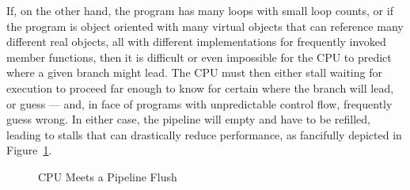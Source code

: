 If, on the other hand, the program has many loops with small loop counts,
or if the program is object oriented with many virtual objects that
can reference many different real objects, all with different implementations
for frequently invoked member functions, then it is difficult or even
impossible for the CPU to predict where a given branch might lead.
The CPU must then either stall waiting for execution to proceed far enough
to know for certain where the branch will lead, or guess --- and, in
face of programs with unpredictable control flow, frequently guess wrong.
In either case, the pipeline will empty and have to be refilled, leading
to stalls that can drastically reduce performance,
as fancifully depicted in Figure~\ref{fig:intro:CPU Meets a Pipeline Flush}.

\begin{figure}[htb]
\begin{center}
\end{center}
\caption{CPU Meets a Pipeline Flush}
\label{fig:intro:CPU Meets a Pipeline Flush}
\end{figure}

